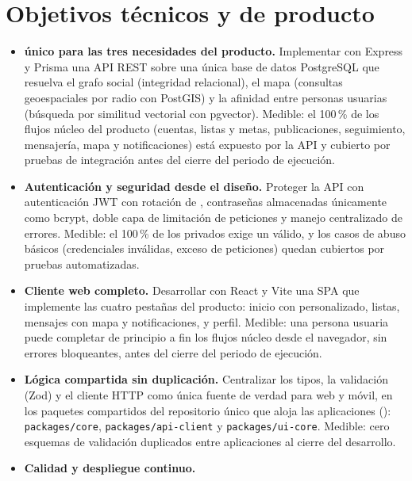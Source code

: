 \section{Objetivos técnicos y de producto}
\label{sec:objetivos-tecnicos}

\begin{itemize}
  \item \textbf{ único para las tres necesidades del producto.}
        Implementar con Express y Prisma una \ac{API} \ac{REST} sobre una única base de datos PostgreSQL que resuelva el grafo social (integridad relacional), el mapa (consultas geoespaciales por radio con PostGIS) y la afinidad entre personas usuarias (búsqueda por similitud vectorial con pgvector).
        Medible: el 100\,\% de los flujos núcleo del producto (cuentas, listas y metas, publicaciones, seguimiento, mensajería, mapa y notificaciones) está expuesto por la \ac{API} y cubierto por pruebas de integración antes del cierre del periodo de ejecución.
  \item \textbf{Autenticación y seguridad desde el diseño.}
        Proteger la \ac{API} con autenticación \ac{JWT} con rotación de , contraseñas almacenadas únicamente como  bcrypt, doble capa de limitación de peticiones y manejo centralizado de errores.
        Medible: el 100\,\% de los  privados exige un  válido, y los casos de abuso básicos (credenciales inválidas, exceso de peticiones) quedan cubiertos por pruebas automatizadas.
  \item \textbf{Cliente web completo.}
        Desarrollar con React y Vite una \ac{SPA} que implemente las cuatro pestañas del producto: inicio con  personalizado, listas, mensajes con mapa y notificaciones, y perfil.
        Medible: una persona usuaria puede completar de principio a fin los flujos núcleo desde el navegador, sin errores bloqueantes, antes del cierre del periodo de ejecución.
  \item \textbf{Lógica compartida sin duplicación.}
        Centralizar los tipos, la validación (Zod) y el cliente \ac{HTTP} como única fuente de verdad para web y móvil, en los paquetes compartidos del repositorio único que aloja las aplicaciones (): \texttt{packages/}\allowbreak\texttt{core}, \texttt{packages/}\allowbreak\texttt{api-client} y \texttt{packages/}\allowbreak\texttt{ui-core}.
        Medible: cero esquemas de validación duplicados entre aplicaciones al cierre del desarrollo.
  \item \textbf{Calidad y despliegue continuo.}

\end{itemize}
